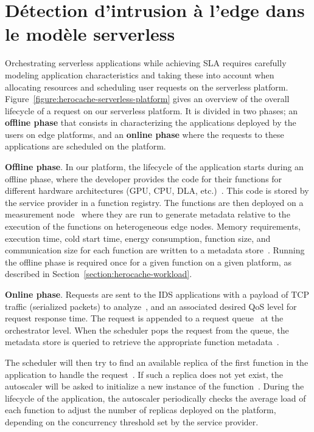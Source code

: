 \section{Détection d'intrusion à l'edge dans le modèle serverless}
\label{section:herocache-before-contrib}

Orchestrating serverless applications while achieving SLA requires carefully modeling application characteristics and taking these into account when allocating resources and scheduling user requests on the serverless platform. Figure~\ref{figure:herocache-serverless-platform} gives an overview of the overall lifecycle of a request on our serverless platform. It is divided in two phases; an \textbf{offline phase} that consists in characterizing the applications deployed by the users on edge platforms, and an \textbf{online phase} where the requests to these applications are scheduled on the platform.

\textbf{Offline phase}. In our platform, the lifecycle of the application starts during an offline phase, where the developer provides the code for their functions for different hardware architectures (GPU, CPU, DLA, etc.)~. This code is stored by the service provider in a function registry. The functions are then deployed on a measurement node~ where they are run to generate metadata relative to the execution of the functions on heterogeneous edge nodes. Memory requirements, execution time, cold start time, energy consumption, function size, and communication size for each function are written to a metadata store~. Running the offline phase is required once for a given function on a given platform, as described in Section~\ref{section:herocache-workload}.

\textbf{Online phase}. Requests are sent to the IDS applications with a payload of TCP traffic (serialized packets) to analyze~, and an associated desired QoS level for request response time. The request is appended to a request queue~ at the orchestrator level. When the scheduler pops the request from the queue, the metadata store is queried to retrieve the appropriate function metadata~.

The scheduler will then try to find an available replica of the first function in the application to handle the request~. If such a replica does not yet exist, the autoscaler will be asked to initialize a new instance of the function~. During the lifecycle of the application, the autoscaler periodically checks the average load of each function to adjust the number of replicas deployed on the platform, depending on the concurrency threshold set by the service provider.


